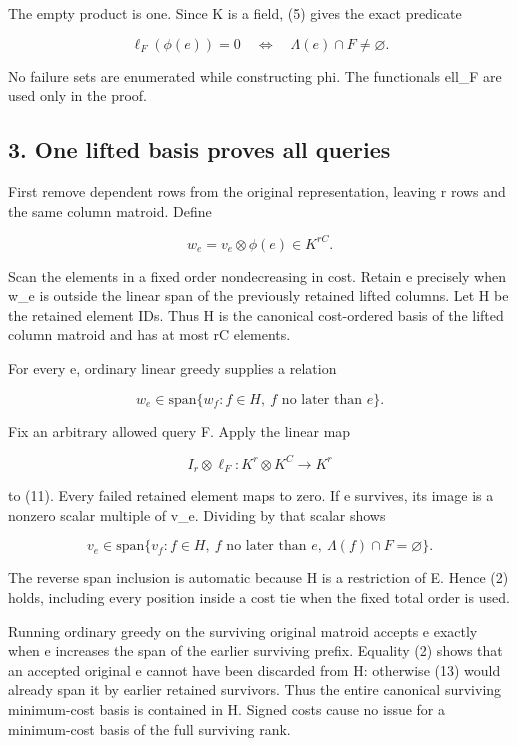 The empty product is one. Since K is a field, (5) gives the exact predicate

\[
\ell_F(\phi(e))=0
 \quad\Longleftrightarrow\quad
 \Lambda(e)\cap F\ne\varnothing.
 \tag{9}
\]

No failure sets are enumerated while constructing phi. The functionals ell\_F are used only in the proof.

\hypertarget{af-7a1626f5ae-one-lifted-basis-proves-all-queries}{%
\subsection{3. One lifted basis proves all queries}\label{af-7a1626f5ae-one-lifted-basis-proves-all-queries}}

First remove dependent rows from the original representation, leaving r rows and the same column matroid. Define

\[
w_e=v_e\otimes\phi(e)\in K^{rC}.
 \tag{10}
\]

Scan the elements in a fixed order nondecreasing in cost. Retain e precisely when w\_e is outside the linear span of the previously retained lifted columns. Let H be the retained element IDs. Thus H is the canonical cost-ordered basis of the lifted column matroid and has at most rC elements.

For every e, ordinary linear greedy supplies a relation

\[
w_e\in\mathrm{span}\{w_f:f\in H,\ f\text{ no later than }e\}.
 \tag{11}
\]

Fix an arbitrary allowed query F. Apply the linear map

\[
I_r\otimes\ell_F:K^r\otimes K^C\longrightarrow K^r
 \tag{12}
\]

to (11). Every failed retained element maps to zero. If e survives, its image is a nonzero scalar multiple of v\_e. Dividing by that scalar shows

\[
v_e\in\mathrm{span}\{v_f:f\in H,\ f\text{ no later than }e,
                                      \ \Lambda(f)\cap F=\varnothing\}.
 \tag{13}
\]

The reverse span inclusion is automatic because H is a restriction of E. Hence (2) holds, including every position inside a cost tie when the fixed total order is used.

Running ordinary greedy on the surviving original matroid accepts e exactly when e increases the span of the earlier surviving prefix. Equality (2) shows that an accepted original e cannot have been discarded from H: otherwise (13) would already span it by earlier retained survivors. Thus the entire canonical surviving minimum-cost basis is contained in H. Signed costs cause no issue for a minimum-cost basis of the full surviving rank.

